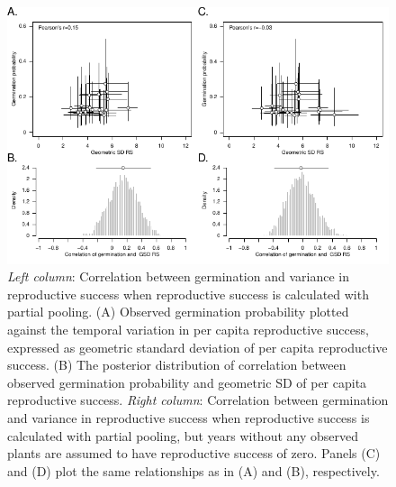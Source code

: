 \documentclass[12pt, oneside, titlepage]{article}   	%
\begin{document}
 \begin{figure}
\centering
       \includegraphics[page=1,width=1\textwidth]{../manuscript/figures/analysis-figure.pdf}  
 \caption{ \textit{Left column}: Correlation between germination and variance in reproductive success when reproductive success is calculated with partial pooling. (A) Observed germination probability plotted against the temporal variation in per capita reproductive success, expressed as geometric standard deviation of per capita reproductive success. (B) The posterior distribution of correlation between observed germination probability and geometric SD of per capita reproductive success. \textit{Right column}: Correlation between germination and variance in reproductive success when reproductive success is calculated with partial pooling, but years without any observed plants are assumed to have reproductive success of zero. Panels (C) and (D) plot the same relationships as in (A) and (B), respectively.}
   \label{fig:obs-pred}
 \end{figure}
\end{document}
